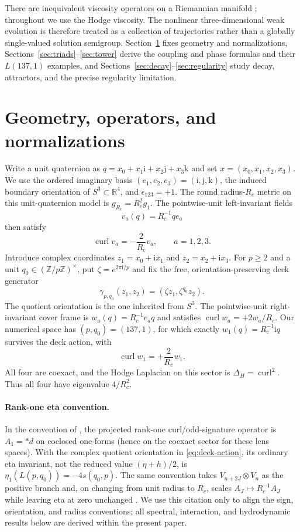 \documentclass[12pt]{article}
\theoremstyle{definition}
\theoremstyle{remark}
\newcommand{\ZZ}{\mathbb Z}
\newcommand{\ii}{\mathrm i}
\newcommand{\curl}{\operatorname{curl}}
\begin{document}
There are inequivalent viscosity operators on a Riemannian manifold
\cite{ChanCzubakDisconzi2017,SamavakiTuomela2020}; throughout we use the Hodge
viscosity.  The nonlinear three-dimensional weak evolution is therefore
treated as a collection of trajectories rather than a globally single-valued
solution semigroup.  Section~\ref{sec:normalization} fixes geometry and
normalizations, Sections~\ref{sec:triads}--\ref{sec:tower} derive the coupling
and phase formulas and their $L(137,1)$ examples, and
Sections~\ref{sec:decay}--\ref{sec:regularity} study decay, attractors, and the
precise regularity limitation.

\section{Geometry, operators, and normalizations}\label{sec:normalization}

Write a unit quaternion as
$q=x_0+x_1\ii+x_2\mathrm j+x_3\mathrm k$ and set
$x=(x_0,x_1,x_2,x_3)$.  We use the ordered imaginary basis
$(e_1,e_2,e_3)=(\ii,\mathrm j,\mathrm k)$, the induced boundary orientation
of $S^3\subset\mathbb R^4$, and $\epsilon_{123}=+1$.  The round
radius-$R_c$ metric on this unit-quaternion model is $g_{R_c}=R_c^2g_1$.
The pointwise-unit left-invariant fields
\[
 v_a(q)=R_c^{-1}q e_a
\]
then satisfy
\[
 \curl v_a=-\frac{2}{R_c}v_a, \qquad a=1,2,3.
\]
Introduce complex coordinates
$z_1=x_0+\ii x_1$ and $z_2=x_2+\ii x_3$.  For $p\ge2$ and a unit
$q_0\in(\ZZ/p\ZZ)^\times$, put $\zeta=e^{2\pi\ii/p}$ and fix the free,
orientation-preserving deck generator
\begin{equation}\label{eq:deck-action}
 \gamma_{p,q_0}(z_1,z_2)=(\zeta z_1,\zeta^{q_0}z_2).
\end{equation}
The quotient orientation is the one inherited from $S^3$.  The pointwise-unit
right-invariant cover frame is $w_a(q)=R_c^{-1}e_aq$ and satisfies
$\curl w_a=+2w_a/R_c$.  Our numerical space has $(p,q_0)=(137,1)$, for which
exactly $w_1(q)=R_c^{-1}\ii q$ survives the deck action, with
\[
 \curl w_1=+\frac{2}{R_c}w_1.
\]
All four are coexact, and the Hodge Laplacian on this sector is
$\Delta_H=\curl^2$.  Thus all four have eigenvalue $4/R_c^2$.

\paragraph{Rank-one eta convention.}
In the convention of \cite{MahmoodP1Collection2026},
the projected rank-one curl/odd-signature operator is $A_1=*d$ on coclosed
one-forms (hence on the coexact sector for these lens spaces).  With the
complex quotient orientation in \eqref{eq:deck-action}, its ordinary eta
invariant, not the reduced value $(\eta+h)/2$, is
$\eta_1(L(p,q_0))=-4s(q_0,p)$.  The same convention takes
$V_{n+2J}\otimes V_n$ as the positive branch and, on changing from unit
radius to $R_c$, scales $A_J\mapsto R_c^{-1}A_J$ while leaving eta at zero
unchanged \cite{APS1975,Bar2019}.  We use this citation only to align the sign,
orientation, and radius conventions; all spectral, interaction, and
hydrodynamic results below are derived within the present paper.
\end{document}
